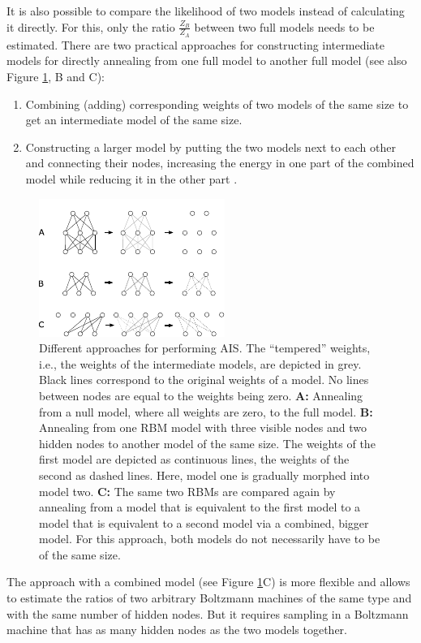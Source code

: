 \documentclass[12pt]{article}
\begin{document}
It is also possible to compare the likelihood of two models instead of calculating it directly.
For this, only the ratio $\frac{Z_B}{Z_A}$ between two full models needs to be estimated.
There are two practical approaches for constructing intermediate models  for directly annealing from one full model to another full model (see also Figure \ref{figTwotypesais}, B and C):
\begin{enumerate}
\item Combining (adding) corresponding weights of two models of the same size to get an intermediate model of the same size.
\item Constructing a larger model by putting the two models next to each other and connecting their nodes, increasing the energy in one part of the combined model while reducing it in the other part \citep{theis2011deepbelief}.
\end{enumerate}
\begin{figure}[h!]
\centering
\includegraphics[scale=3.5]{images/twotypesais.pdf}
\caption{Different approaches for performing AIS.
The ``tempered'' weights, i.e., the weights of the intermediate models, are depicted in grey. Black lines correspond to the original weights of a model. No lines between nodes are equal to the weights being zero.
{\bf A:} Annealing from a null model, where all weights are zero, to the full model.
{\bf B:} Annealing from one RBM model with three visible nodes and two hidden nodes to another model of the same size.
The weights of the first model are depicted as continuous lines, the weights of the second as dashed lines. Here, model one is gradually morphed into model two. {\bf C:}
The same two RBMs are compared again by annealing from a model that is equivalent to the first model to a model that is equivalent to a second model via a combined, bigger model. For this approach, both models do not necessarily have to be of the same size.}
\label{figTwotypesais}
\end{figure}
The approach with a combined model (see Figure \ref{figTwotypesais}C) is more flexible and allows to estimate the ratios of two arbitrary Boltzmann machines of the same type and with the same number of hidden nodes.
But it requires sampling in a Boltzmann machine that has as many hidden nodes as the two models together.
\end{document}
